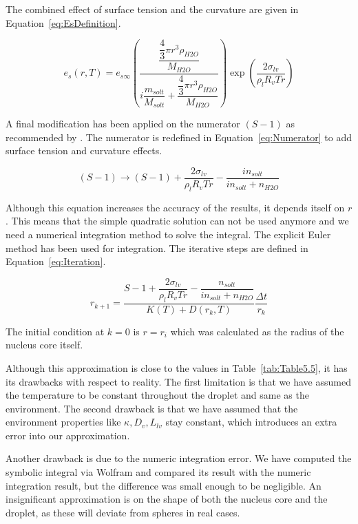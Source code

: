 \documentclass[]{article}
\begin{document}
The combined effect of surface tension and the curvature are given in
Equation~\eqref{eq:EsDefinition}.

\begin{equation}
    \label{eq:EsDefinition}
    e_{s}(r,T)=e_{s\infty}\left(\dfrac{\dfrac{\dfrac{4}{3}\pi r^{3} \rho_{H2O}}{M_{H2O}}}{i \dfrac{m_{solt}}{M_{solt}} + \dfrac{\dfrac{4}{3}\pi r^{3} \rho_{H2O}}{M_{H2O}}}\right) \exp \left( \dfrac{2\sigma_{lv}}{\rho_{l}R_{v}Tr} \right)
\end{equation}

A final modification has been applied on the numerator $(S-1)$ as recommended
by \cite{Mason}. The numerator is redefined in Equation~\eqref{eq:Numerator} to
add surface tension and curvature effects.

\begin{equation}
    \label{eq:Numerator}
    (S-1) \rightarrow (S-1)+\dfrac{2\sigma_{lv}}{\rho_{l}R_{v}Tr}-\dfrac{i n_{solt}}{i n_{solt}+n_{H2O}}
\end{equation}

Although this equation increases the accuracy of the results, it depends itself
on $r$. This means that the simple quadratic solution can not be used anymore
and we need a numerical integration method to solve the integral. The explicit
Euler method has been used for integration. The iterative steps are defined in
Equation~\eqref{eq:Iteration}.

\begin{equation}
    \label{eq:Iteration}
    r_{k+1}= \dfrac{S - 1+\dfrac{2\sigma_{lv}}{\rho_{l}R_{v}Tr}-\dfrac{n_{solt}}{i n_{solt}+n_{H2O}}}{K(T) + D(r_{k},T)}\dfrac{\Delta t}{r_{k}}
\end{equation}

The initial condition at $k=0$ is $r=r_{i}$ which was calculated as the radius
of the nucleus core itself.

Although this approximation is close to the values in
Table~\ref{tab:Table5.5}, it has its drawbacks with respect to reality. The
first limitation is that we have assumed the temperature to be constant
throughout the droplet and same as the environment. The second drawback is that
we have assumed that the environment properties like $\kappa, D_{v}, L_{lv}$
stay constant, which introduces an extra error into our approximation.

Another drawback is due to the numeric integration error. We have computed the
symbolic integral via Wolfram and compared its result with the numeric
integration result, but the difference was small enough to be negligible. An
insignificant approximation is on the shape of both the nucleus core and the
droplet, as these will deviate from spheres in real cases.
\end{document}
